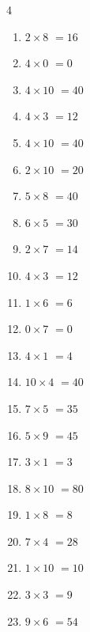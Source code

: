 \begin{multicols}{4}
\begin{enumerate}
  \item $2\times 8$
        $=16$

  \item $4\times 0$
        $=0$

  \item $4\times 10$
        $=40$

  \item $4\times 3$
        $=12$

  \item $4\times 10$
        $=40$

  \item $2\times 10$
        $=20$

  \item $5\times 8$
        $=40$

  \item $6\times 5$
        $=30$

  \item $2\times 7$
        $=14$

  \item $4\times 3$
        $=12$

  \item $1\times 6$
        $=6$

  \item $0\times 7$
        $=0$

  \item $4\times 1$
        $=4$

  \item $10\times 4$
        $=40$

  \item $7\times 5$
        $=35$

  \item $5\times 9$
        $=45$

  \item $3\times 1$
        $=3$

  \item $8\times 10$
        $=80$

  \item $1\times 8$
        $=8$

  \item $7\times 4$
        $=28$

  \item $1\times 10$
        $=10$

\columnbreak %

  \item $3\times 3$
        $=9$

  \item $9\times 6$
        $=54$


\end{enumerate}
\end{multicols}
